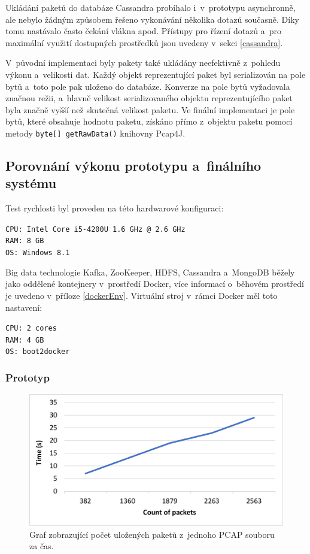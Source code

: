 \noindent Ukládání paketů do databáze Cassandra probíhalo i~v~prototypu asynchronně, ale nebylo žádným způsobem řešeno vykonávání několika dotazů současně. Díky tomu nastávalo často čekání vlákna apod. Přístupy pro řízení dotazů a~pro maximální využití dostupných prostředků jsou uvedeny v~sekci \ref{cassandra}.

V~původní implementaci byly pakety také ukládány neefektivně z~pohledu výkonu a~velikosti dat. Každý objekt reprezentující paket byl serializován na pole bytů a~toto pole pak uloženo do databáze. Konverze na pole bytů vyžadovala značnou režii, a~hlavně velikost serializovaného objektu reprezentujícího paket byla značně vyšší než skutečná velikost paketu. Ve finální implementaci je pole bytů, které obsahuje hodnotu paketu, získáno přímo z~objektu paketu pomocí metody \texttt{byte[] getRawData()} knihovny Pcap4J.

\subsection{Porovnání výkonu prototypu a~finálního systému}
Test rychlosti byl proveden na této hardwarové konfiguraci:

\vspace{0.5cm}
\noindent \texttt{CPU: Intel Core i5-4200U 1.6 GHz @ 2.6 GHz} \\
\texttt{RAM: 8 GB} \\
\texttt{OS: Windows 8.1}

\vspace{0.5cm}
\noindent Big data technologie Kafka, ZooKeeper, HDFS, Cassandra a~MongoDB běžely jako oddělené kontejnery v~prostředí Docker, více informací o~běhovém prostředí je uvedeno v~příloze \ref{dockerEnv}. Virtuální stroj v~rámci Docker měl toto nastavení:

\vspace{0.5cm}
\noindent \texttt{CPU: 2 cores} \\
\texttt{RAM: 4 GB} \\
\texttt{OS: boot2docker}

\subsubsection{Prototyp}

\begin{figure}[!h]
    \centering
    \includegraphics[width=15cm]{template-fig/PrototypePerformanceChart.pdf}
    \caption{Graf zobrazující počet uložených paketů z~jednoho PCAP souboru za čas.}
    \label{FIG_PerformanceChartPrototype}
\end{figure}

